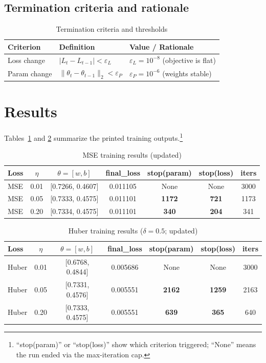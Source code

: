 \documentclass[11pt]{article}
\begin{document}
\subsection*{Termination criteria and rationale}
\begin{table}[h]
\centering
\caption{Termination criteria and thresholds}
\begin{tabular}{@{}lll@{}}
\toprule
Criterion & Definition & Value / Rationale \\
\midrule
Loss change & $|L_t-L_{t-1}|<\varepsilon_L$ & $\varepsilon_L=10^{-8}$ (objective is flat) \\
Param change & $\|\theta_t-\theta_{t-1}\|_2<\varepsilon_P$ & $\varepsilon_P=10^{-6}$ (weights stable) \\
\bottomrule
\end{tabular}
\end{table}

\section{Results}
Tables~\ref{tab:mse} and \ref{tab:huber} summarize the printed training outputs.\footnote{“stop(param)” or “stop(loss)” show which criterion triggered; “None” means the run ended via the max-iteration cap.}

\begin{table}[h]
\centering
\caption{MSE training results (updated)}
\label{tab:mse}
\begin{tabular}{@{}lcccccc@{}}
\toprule
Loss & $\eta$ & $\theta=[w,b]$ & final\_loss & stop(param) & stop(loss) & iters \\
\midrule
MSE & 0.01 & [0.7266, 0.4607] & 0.011105 & None  & None  & 3000 \\
MSE & 0.05 & [0.7333, 0.4575] & 0.011101 & \textbf{1172} & \textbf{721} & 1173 \\
MSE & 0.20 & [0.7334, 0.4575] & 0.011101 & \textbf{340}  & \textbf{204} & 341 \\
\bottomrule
\end{tabular}
\end{table}

\begin{table}[h]
\centering
\caption{Huber training results ($\delta=0.5$; updated)}
\label{tab:huber}
\begin{tabular}{@{}lcccccc@{}}
\toprule
Loss & $\eta$ & $\theta=[w,b]$ & final\_loss & stop(param) & stop(loss) & iters \\
\midrule
Huber & 0.01 & [0.6768, 0.4844] & 0.005686 & None  & None  & 3000 \\
Huber & 0.05 & [0.7331, 0.4576] & 0.005551 & \textbf{2162} & \textbf{1259} & 2163 \\
Huber & 0.20 & [0.7333, 0.4575] & 0.005551 & \textbf{639}  & \textbf{365}  & 640 \\
\bottomrule
\end{tabular}
\end{table}
\end{document}
